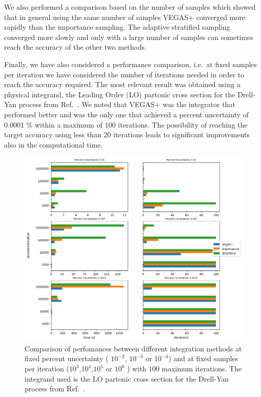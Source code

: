 \documentclass[../main/main.tex]{subfiles}
\begin{document}
We also performed a comparison based on the number of samples which showed that in general using the same number of samples VEGAS+
converged more rapidly than the importance sampling. The adaptive stratified sampling converged more slowly and only with a large number of samples can sometimes reach the accuracy of the other two methods.

Finally, we have also considered a performance comparison, i.e.\ at fixed samples per iteration we have considered the number of iterations needed in order to reach the accuracy required.
The most relevant result was obtained using a physical integrand, the Leading Order (LO) partonic cross section for the Drell-Yan process from Ref.~\cite{Carrazza_2020}.
We noted that VEGAS+ was the integrator that performed better and was the only one that achieved a percent uncertainty of 0.0001 \% within a maximum of 100 iterations.
The possibility of reaching the target accuracy using less than 20 iterations leads to significant improvements also in the computational time. 

\begin{figure}
	\centering
	\includegraphics[width=15cm]{../../../tests/performance_plots/dy_aa.png}
	\caption{Comparison of perfomances between different integration methods at fixed percent uncertainty ( $10^{-2}$, $10^{-3}$ or $10^{-4}$) and at fixed samples per iteration ($10^3$,$10^4$,$10^5$ or $10^6$ ) with $100$ maximum iterations. The integrand used is the LO partonic cross section for the Drell-Yan process from Ref.~\cite{Carrazza_2020}.}
	\label{dy_aa}
\end{figure}
\end{document}
